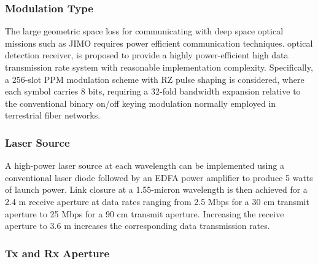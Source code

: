 \subsubsection{Modulation Type}

The large geometric space loss for communicating with deep space optical missions such as JIMO requires power efficient communication techniques.
optical detection receiver, is proposed to provide a highly power-efficient high data transmission rate system with reasonable implementation complexity. Specifically, a 256-slot PPM modulation scheme with RZ pulse shaping is considered, where each symbol carries 8 bits, requiring a 32-fold bandwidth expansion relative to the conventional binary on/off keying modulation normally employed in terrestrial fiber networks.

\subsubsection{Laser Source}

A high-power laser source at each wavelength can be implemented using a conventional laser diode followed by an EDFA power amplifier to produce 5 watts of launch power. Link closure at a 1.55-micron wavelength is then achieved for a 2.4 m receive aperture at data rates ranging from 2.5 Mbps for a 30 cm transmit aperture to 25 Mbps for a 90 cm transmit aperture. Increasing the receive aperture to 3.6 m increases the corresponding data transmission rates.

\subsubsection{Tx and Rx Aperture}

